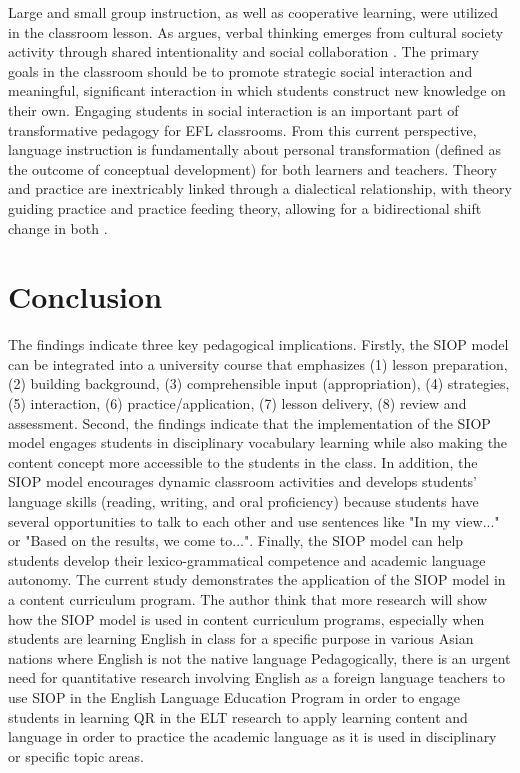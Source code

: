 \documentclass[english]{textolivre}
\begin{document}
Large and small group instruction, as well as cooperative learning, were utilized in the classroom lesson. As \textcite{tomasello_natural_2014} argues, verbal thinking emerges from cultural society activity through shared intentionality and social collaboration \cite{negueruelaazarola_internalization_2013}. The primary goals in the classroom should be to promote strategic social interaction \cite{di_pietro_strategic_1987} and meaningful, significant interaction in which students construct new knowledge on their own. Engaging students in social interaction is an important part of transformative pedagogy for EFL classrooms. From this current perspective, language instruction is fundamentally about personal transformation (defined as the outcome of conceptual development) for both learners and teachers. Theory and practice are inextricably linked through a dialectical relationship, with theory guiding practice and practice feeding theory, allowing for a bidirectional shift change in both \cite{lantolf_sociocultural_2014}.

\section{Conclusion}\label{sec-secoes}
The findings indicate three key pedagogical implications. Firstly, the SIOP model can be integrated into a university course that emphasizes (1) lesson preparation, (2) building background, (3) comprehensible input (appropriation), (4) strategies, (5) interaction, (6) practice/application, (7) lesson delivery, (8) review and assessment. Second, the findings indicate that the implementation of the SIOP model engages students in disciplinary vocabulary learning while also making the content concept more accessible to the students in the class. In addition, the SIOP model encourages dynamic classroom activities and develops students' language skills (reading, writing, and oral proficiency) because students have several opportunities to talk to each other and use sentences like "In my view..." or "Based on the results, we come to...". Finally, the SIOP model can help students develop their lexico-grammatical competence and academic language autonomy. The current study demonstrates the application of the SIOP model in a content curriculum program. The author think that more research will show how the SIOP model is used in content curriculum programs, especially when students are learning English in class for a specific purpose in various Asian nations where English is not the native language Pedagogically, there is an urgent need for quantitative research involving English as a foreign language teachers to use SIOP in the English Language Education Program in order to engage students in learning QR in the ELT research to apply learning content and language in order to practice the academic language as it is used in disciplinary or specific topic areas.
\end{document}
